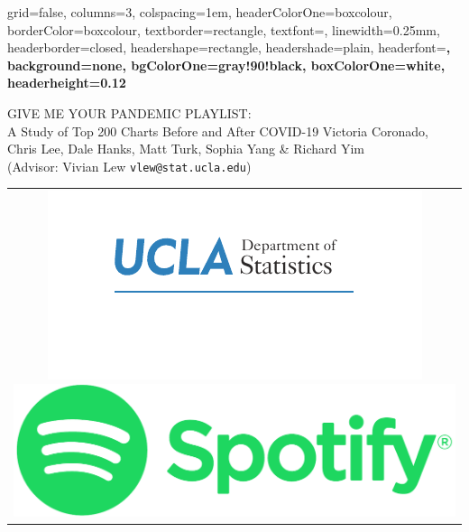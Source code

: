 \documentclass[landscape,a0paper,fontscale=0.34]{baposter}
\begin{document}
\begin{poster}{
 grid=false,
 columns=3,
 colspacing=1em,
 headerColorOne=boxcolour, %
 borderColor=boxcolour,
 textborder=rectangle,
 textfont=\sffamily,
 linewidth=0.25mm,
 headerborder=closed,
 headershape=rectangle,
 headershade=plain,
 headerfont=\large\rmfamily\bf,
 background=none,
 bgColorOne=gray!90!black,
 boxColorOne=white,
 headerheight=0.12\textheight}

{\huge GIVE ME YOUR PANDEMIC PLAYLIST:\\[0.2em] A Study of Top 200 Charts Before and After COVID-19}
{Victoria Coronado, Chris Lee, Dale Hanks, Matt Turk, Sophia Yang \& Richard Yim
 \\[0.2em]{(Advisor: Vivian Lew \texttt{vlew@stat.ucla.edu})}}
 {
  \begin{tabular}{c}
    \includegraphics[height=0.09\textheight]{ps_statistics_DoS}%
    \includegraphics[height=0.09\textheight]{Spotify_Logo_RGB_Green}
  \end{tabular}
 }



\end{poster}
\end{document}
